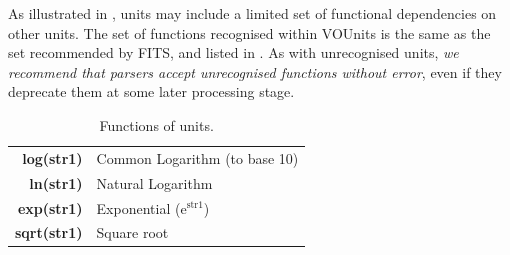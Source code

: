 \documentclass[11pt,notitlepage,onecolumn]{ivoa}
\def\eg{e.g.~}
\newcommand{\unit}[1]{\textbf{\textsf{\color{orange}#1}}}
\begin{document}
As illustrated in , units may include a
limited set of functional dependencies on other units.  The set of
functions recognised within VOUnits is the same as the set recommended
by FITS, and listed in .  As with
unrecognised units,
\emph{we recommend that parsers accept unrecognised functions without error},
even if they deprecate them at some later processing stage.
\begin{table}%
\begin{center}
\def\arraystretch{1.2}
\begin{tabular}{|r|l|}
\hline
\unit{log(str1)} & Common Logarithm (to base 10) \\
\unit{ln(str1)} & Natural Logarithm \\
\unit{exp(str1)} & Exponential (e$^{\mathrm{str1}}$) \\
\unit{sqrt(str1)} & Square root \\
\hline
\end{tabular}
\end{center}
\caption{\label{tab:functions}Functions of units.}
\end{table}


%
%
%
%
\end{document}
